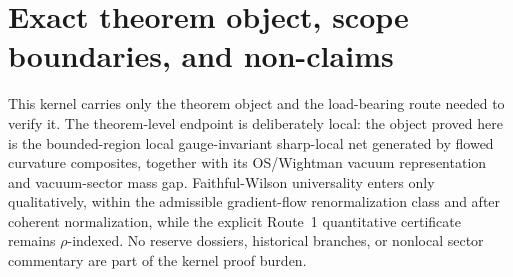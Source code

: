 \section{Exact theorem object, scope boundaries, and non-claims}\label{sec:scope}

This kernel carries only the theorem object and the load-bearing route needed to verify it. The theorem-level endpoint is deliberately local: the object proved here is the bounded-region local gauge-invariant sharp-local net generated by flowed curvature composites, together with its OS/Wightman vacuum representation and vacuum-sector mass gap. Faithful-Wilson universality enters only qualitatively, within the admissible gradient-flow renormalization class and after coherent normalization, while the explicit Route~1 quantitative certificate remains $\rho$-indexed. No reserve dossiers, historical branches, or nonlocal sector commentary are part of the kernel proof burden.

